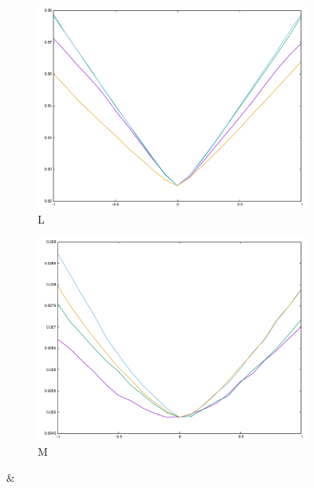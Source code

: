 {\begin{figure}[H]
\begin{subfigure}{.33\textwidth}
\end{subfigure}\\
\begin{subfigure}{.33\textwidth}
	\includegraphics[width=\linewidth]{fig/ajherr/t3/L_mae.pdf}
	\caption{L}
\end{subfigure}%
\begin{subfigure}{.33\textwidth}
	\includegraphics[width=\linewidth]{fig/ajherr/t3/M_mae.pdf}
	\caption{M}
\end{subfigure}&
\begin{subfigure}{.33\textwidth}

\end{subfigure}
\end{figure}}
